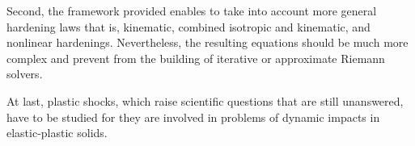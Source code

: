 Second, the framework provided enables to take into account more general hardening laws that is, kinematic, combined isotropic and kinematic, and nonlinear hardenings.
Nevertheless, the resulting equations should be much more complex and prevent from the building of iterative or approximate Riemann solvers.

At last, plastic shocks, which raise scientific questions that are still unanswered, have to be studied for they are involved in problems of dynamic impacts in elastic-plastic solids.



